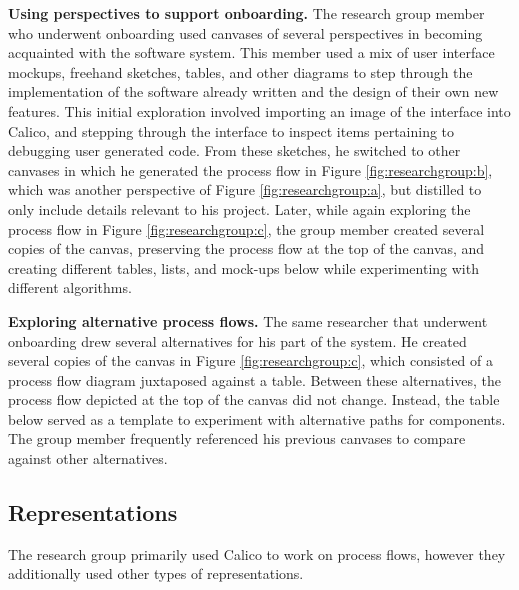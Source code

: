 \textbf{Using perspectives to support onboarding.} The research group member who underwent onboarding used canvases of several perspectives in becoming acquainted with the software system. This member used a mix of user interface mockups, freehand sketches, tables, and other diagrams to step through the implementation of the software already written and the design of their own new features. This initial exploration involved importing an image of the interface into Calico,  and stepping through the interface to inspect items pertaining to debugging user generated code. From these sketches, he switched to other canvases in which he generated the process flow in Figure \ref{fig:researchgroup:b}, which was another perspective of Figure \ref{fig:researchgroup:a}, but distilled to only include details relevant to his project. Later, while again exploring the process flow in Figure \ref{fig:researchgroup:c}, the group member created several copies of the canvas, preserving the process flow at the top of the canvas, and creating different tables, lists, and mock-ups below while experimenting with different algorithms.

\textbf{Exploring alternative process flows.} The same researcher that underwent onboarding drew several alternatives for his part of the system. He created several copies of the canvas in Figure \ref{fig:researchgroup:c}, which consisted of a process flow diagram juxtaposed against a table. Between these alternatives, the process flow depicted at the top of the canvas did not change. Instead, the table below served as a template to experiment with alternative paths for components. The group member frequently referenced his previous canvases to compare against other alternatives.




\subsection{Representations}

The research group primarily used Calico to work on process flows, however they additionally used other types of representations.

